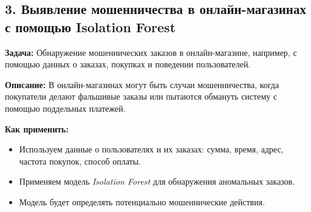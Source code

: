 \subsection{3. Выявление мошенничества в онлайн-магазинах с помощью Isolation Forest}
\textbf{Задача:} Обнаружение мошеннических заказов в онлайн-магазине, например, с помощью данных о заказах, покупках и поведении пользователей.

\textbf{Описание:} В онлайн-магазинах могут быть случаи мошенничества, когда покупатели делают фальшивые заказы или пытаются обмануть систему с помощью поддельных платежей.

\textbf{Как применить:}
\begin{itemize}
    \item Используем данные о пользователях и их заказах: сумма, время, адрес, частота покупок, способ оплаты.
    \item Применяем модель \textit{Isolation Forest} для обнаружения аномальных заказов.
    \item Модель будет определять потенциально мошеннические действия.
\end{itemize}

